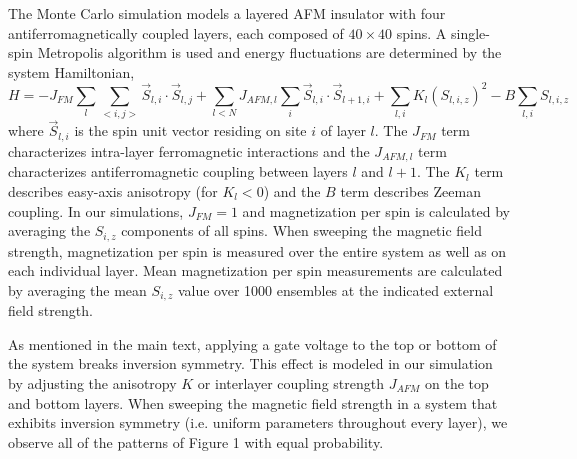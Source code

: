 \documentclass[10pt]{article}
\begin{document}
The Monte Carlo simulation models a layered AFM insulator with four antiferromagnetically coupled layers, each composed of $40 \times 40$ spins. A single-spin Metropolis algorithm is used and energy
fluctuations are determined by the system Hamiltonian,
$$H = -J_{FM}\sum_{l}\sum_{<i,j>}\vec{S}_{l,i}\cdot \vec{S}_{l,j} + \sum_{l < N}J_{AFM,l}\sum_{i}\vec{S}_{l,i} \cdot \vec{S}_{l+1,i} + \sum_{l,i}K_{l}\left (S_{l,i,z}\right )^{2} - B \sum_{l,i}S_{l,i,z}$$
where $\vec{S}_{l,i}$ is the spin unit vector residing on site $i$ of layer $l$. The $J_{FM}$ term characterizes intra-layer
ferromagnetic interactions and the $J_{AFM,l}$ term characterizes antiferromagnetic coupling between layers $l$ and $l+1$. The $K_{l}$ term describes
easy-axis anisotropy (for $K_{l} < 0$) and the $B$ term describes Zeeman coupling.
In our simulations, $J_{FM} = 1$ and magnetization per spin is calculated by averaging the $S_{i,z}$ components of all spins.
When sweeping the magnetic field strength, magnetization per spin is measured over the entire system as well as on each individual layer. Mean magnetization per spin measurements
are calculated by averaging the mean $S_{i,z}$ value over 1000 ensembles at the indicated external field strength.

As mentioned in the main text, applying a gate voltage to the top or bottom of the system breaks inversion symmetry. This effect is modeled in our simulation
by adjusting the anisotropy $K$ or interlayer coupling strength $J_{AFM}$ on the top and bottom layers. When sweeping the magnetic field strength in a system that exhibits
inversion symmetry (i.e. uniform parameters throughout every layer), we observe all of the patterns of Figure 1 with equal probability.
\end{document}
